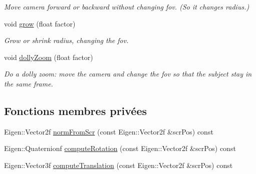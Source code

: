 \begin{DoxyCompactItemize}
\begin{DoxyCompactList}\small\item\em Move camera forward or backward without changing fov. (So it changes radius.) \end{DoxyCompactList}\item 
void \hyperlink{class_trackball_a4ac38af7646e5998ac341051d0458c58}{grow} (float factor)
\begin{DoxyCompactList}\small\item\em Grow or shrink radius, changing the fov. \end{DoxyCompactList}\item 
void \hyperlink{class_trackball_a12d2e0436352bb7d222e2a3aed39e41c}{dolly\+Zoom} (float factor)
\begin{DoxyCompactList}\small\item\em Do a dolly zoom\+: move the camera and change the fov so that the subject stay in the same frame. \end{DoxyCompactList}\end{DoxyCompactItemize}
\subsection*{Fonctions membres privées}
\begin{DoxyCompactItemize}
\item 
Eigen\+::\+Vector2f \hyperlink{class_trackball_a84d3a79355d75d73e72ca10f5d469728}{norm\+From\+Scr} (const Eigen\+::\+Vector2f \&scr\+Pos) const
\item 
Eigen\+::\+Quaternionf \hyperlink{class_trackball_af3a13b098e2bb5af29c2ef295969ba25}{compute\+Rotation} (const Eigen\+::\+Vector2f \&scr\+Pos) const
\item 
Eigen\+::\+Vector3f \hyperlink{class_trackball_a2cddc7573037b7988d720664a4099ff6}{compute\+Translation} (const Eigen\+::\+Vector2f \&scr\+Pos) const
\end{DoxyCompactItemize}
